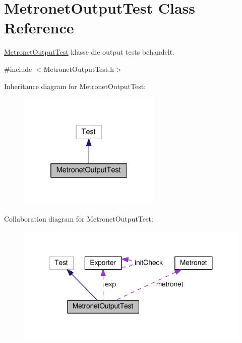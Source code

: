 \hypertarget{class_metronet_output_test}{}\section{Metronet\+Output\+Test Class Reference}
\label{class_metronet_output_test}


\hyperlink{class_metronet_output_test}{Metronet\+Output\+Test} klasse die output tests behandelt.  




{\ttfamily \#include $<$Metronet\+Output\+Test.\+h$>$}



Inheritance diagram for Metronet\+Output\+Test\+:
\nopagebreak
\begin{figure}[H]
\begin{center}
\leavevmode
\includegraphics[width=193pt]{class_metronet_output_test__inherit__graph}
\end{center}
\end{figure}


Collaboration diagram for Metronet\+Output\+Test\+:
\nopagebreak
\begin{figure}[H]
\begin{center}
\leavevmode
\includegraphics[width=338pt]{class_metronet_output_test__coll__graph}
\end{center}
\end{figure}
